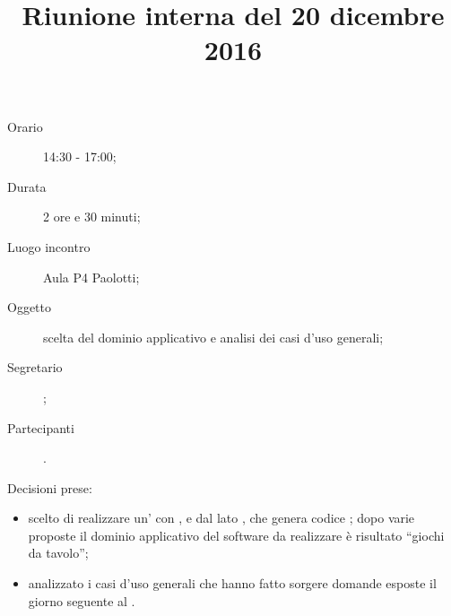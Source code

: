 


\author{\PB}
\supervisor{\MM}
\title{Riunione interna del 20 dicembre 2016}



\maketitle

\begin{description}
	\item[Orario] 14:30 - 17:00;
	\item[Durata] 2 ore e 30 minuti;
	\item[Luogo incontro] Aula P4 Paolotti;
	\item[Oggetto] scelta del dominio applicativo e analisi dei casi d'uso generali;
	\item[Segretario] \PB; 
	\item[Partecipanti] \ALL.
\end{description}
Decisioni prese:
\begin{itemize}
\item scelto di realizzare un' con ,  e  dal lato , che genera codice ; dopo varie proposte il dominio applicativo del software da realizzare è risultato “giochi da tavolo”;
\item analizzato i casi d'uso generali che hanno fatto sorgere domande esposte il giorno seguente al \GP.
\end{itemize}

